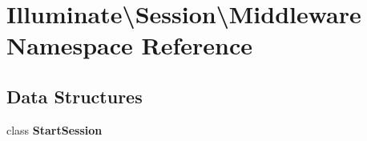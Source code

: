 \section{Illuminate\textbackslash{}Session\textbackslash{}Middleware Namespace Reference}
\label{namespace_illuminate_1_1_session_1_1_middleware}
\subsection*{Data Structures}
\begin{DoxyCompactItemize}
\item 
class {\bf Start\+Session}
\end{DoxyCompactItemize}
